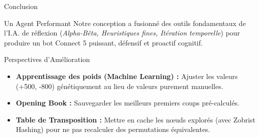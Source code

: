 \documentclass{beamer}
\begin{document}
\begin{frame}{Conclusion}
    \begin{block}{Un Agent Performant}
        Notre conception a fusionné des outils fondamentaux de l'I.A. de réflexion (\textit{Alpha-Bêta, Heuristiques fines, Itération temporelle}) pour produire un bot Connect 5 puissant, défensif et proactif cognitif.
    \end{block}
    
    \vspace{0.3cm}
    
    \begin{block}{Perspectives d'Amélioration}
        \begin{itemize}
            \item \textbf{Apprentissage des poids (Machine Learning) :} Ajuster les valeurs (+500, -800) génétiquement au lieu de valeurs purement manuelles.
            \item \textbf{Opening Book :} Sauvegarder les meilleurs premiers coups pré-calculés.
            \item \textbf{Table de Transposition :} Mettre en cache les nœuds explorés (avec Zobrist Hashing) pour ne pas recalculer des permutations équivalentes.
        \end{itemize}
    \end{block}
\end{frame}
\end{document}
